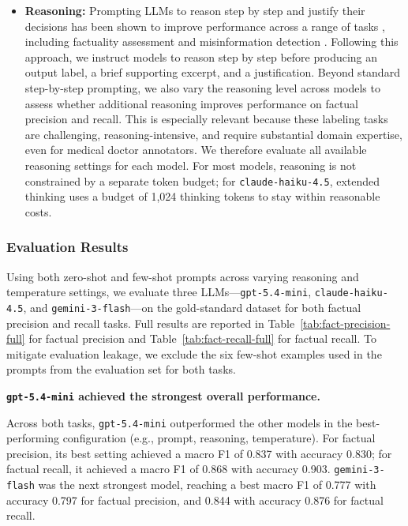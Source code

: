 \documentclass{article}
\newcommand{\xhdr}[1]{%
  \noindent\textbf{#1.}
}
\begin{document}
\begin{itemize}
    \item \textbf{Reasoning:} Prompting LLMs to reason step by step and justify their decisions has been shown to improve performance across a range of tasks \cite{10.5555/3600270.3602070}, including factuality assessment and misinformation detection \cite{Jung_Juneja_Mitra_2025, Mittal_Jung_ElSherief_Mitra_De_Choudhury_2025}. Following this approach, we instruct models to reason step by step before producing an output label, a brief supporting excerpt, and a justification. Beyond standard step-by-step prompting, we also vary the reasoning level across models to assess whether additional reasoning improves performance on factual precision and recall. This is especially relevant because these labeling tasks are challenging, reasoning-intensive, and require substantial domain expertise, even for medical doctor annotators. We therefore evaluate all available reasoning settings for each model. For most models, reasoning is not constrained by a separate token budget; for \texttt{claude-haiku-4.5}, extended thinking uses a budget of 1{,}024 thinking tokens to stay within reasonable costs.
\end{itemize}


\subsubsection{Evaluation Results}\label{appendix:llm-judge-result}

Using both zero-shot and few-shot prompts across varying reasoning and temperature settings, we evaluate three LLMs---\texttt{gpt-5.4-mini}, \texttt{claude-haiku-4.5}, and \texttt{gemini-3-flash}---on the gold-standard dataset for both factual precision and recall tasks. Full results are reported in Table~\ref{tab:fact-precision-full} for factual precision and Table~\ref{tab:fact-recall-full} for factual recall. To mitigate evaluation leakage, we exclude the six few-shot examples used in the prompts from the evaluation set for both tasks.

\xhdr{\texttt{gpt-5.4-mini} achieved the strongest overall performance}
Across both tasks, \texttt{gpt-5.4-mini} outperformed the other models in the best-performing configuration (e.g., prompt, reasoning, temperature). For factual precision, its best setting achieved a macro F1 of 0.837 with accuracy 0.830; for factual recall, it achieved a macro F1 of 0.868 with accuracy 0.903. \texttt{gemini-3-flash} was the next strongest model, reaching a best macro F1 of 0.777 with accuracy 0.797 for factual precision, and 0.844 with accuracy 0.876 for factual recall. 
\end{document}
